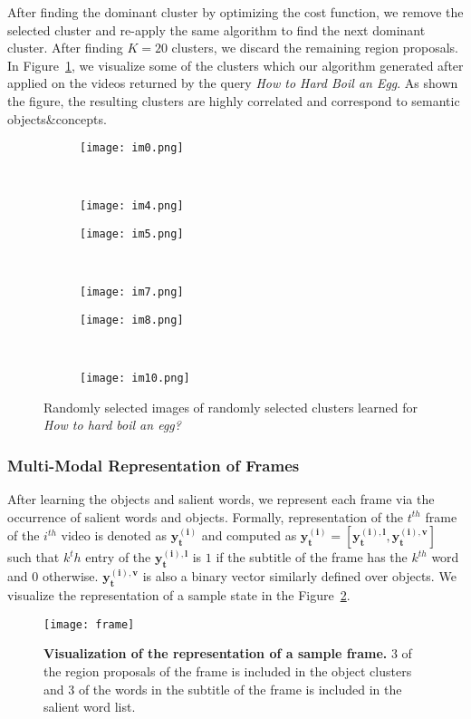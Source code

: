After finding the dominant cluster by optimizing the cost function, we remove the selected cluster and re-apply the same algorithm to find the next dominant cluster. After finding $K=20$ clusters, we discard the remaining region proposals. In Figure~\ref{cvis}, we visualize some of the clusters which our algorithm generated after applied on the videos returned by the query \emph{How to Hard Boil an Egg}. As shown the figure, the resulting clusters are highly correlated and correspond to semantic objects\&concepts.
\begin{figure}[ht]
  \begin{subfigure}[b]{0.23\textwidth}
\texttt{[image: im0.png]}
\end{subfigure}
~
\begin{subfigure}[b]{0.23\textwidth}
\texttt{[image: im4.png]}
\end{subfigure}
\begin{subfigure}[b]{0.23\textwidth}
\texttt{[image: im5.png]}
\end{subfigure}
~
\begin{subfigure}[b]{0.23\textwidth}
\texttt{[image: im7.png]}
\end{subfigure}

\begin{subfigure}[b]{0.23\textwidth}
\texttt{[image: im8.png]}
\end{subfigure}
~
\begin{subfigure}[b]{0.23\textwidth}
\texttt{[image: im10.png]}
\end{subfigure}
\caption{Randomly selected images of randomly selected clusters learned for \emph{How to hard boil an egg?}}
\label{cvis}
\end{figure}


\subsubsection{Multi-Modal Representation of Frames}
After learning the objects and salient words, we represent each frame via the occurrence of salient words and objects. Formally, representation of the $t^{th}$ frame of the $i^{th}$ video is denoted as $\mathbf{y^{(i)}_t}$ and computed as $\mathbf{y^{(i)}_t}=[\mathbf{y^{(i),l}_t},\mathbf{y^{(i),v}_t}]$ such that $k^th$ entry of the $\mathbf{y^{(i),l}_t}$ is $1$ if the subtitle of the frame has the $k^{th}$ word and $0$ otherwise. $\mathbf{y^{(i),v}_t}$ is also a binary vector similarly defined over objects. We visualize the representation of a sample state in the Figure~\ref{visFrame}.

\begin{figure}
  \texttt{[image: frame]}
  \caption{\textbf{Visualization of the representation of a sample frame.} 3 of the region proposals of the frame is included in the object clusters and 3 of the words in the subtitle of the frame is included in the salient word list.}
  \label{visFrame}
\end{figure}
